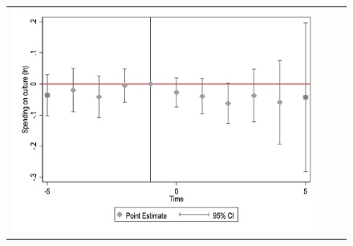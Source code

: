 \begin{figure}[ht]
\begin{tabular}{@{}ccc@{}}
\begin{minipage}[t]{0.32\textwidth}
            \includegraphics[width=\linewidth]{images/pop_10000/caseventdd_ln_q4_05_step1.jpg}
            \label{fig:casculture}
        \end{minipage} \\[10pt]


\end{tabular}
\end{figure}
